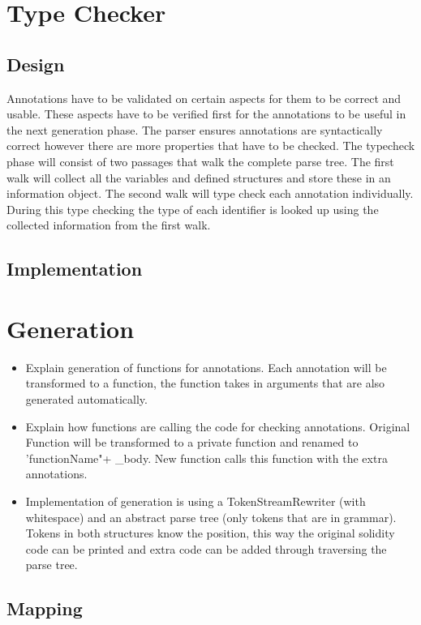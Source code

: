 \documentclass[a4paper]{article}
\begin{document}
\section{Type Checker}
\label{sec:typechecker}
\subsection{Design}
Annotations have to be validated on certain aspects for them to be correct and usable. These aspects have to be verified first for the annotations to be useful in the next generation phase. The parser ensures annotations are syntactically correct however there are more properties that have to be checked. The typecheck phase will consist of two passages that walk the complete parse tree. The first walk will collect all the variables and defined structures and store these in an information object. The second walk will type check each annotation individually. During this type checking the type of each identifier is looked up using the collected information from the first walk. 
\subsection{Implementation}


\section{Generation}
\label{sec:generation}
\begin{itemize}
    \item Explain generation of functions for annotations. Each annotation will be transformed to a function, the function takes in arguments that are also generated automatically.
    \item Explain how functions are calling the code for checking annotations. Original Function will be transformed to a private function and renamed to 'functionName"+ \_body. New function calls this function with the extra annotations.
    \item Implementation of generation is using a TokenStreamRewriter (with whitespace) and an abstract parse tree (only tokens that are in grammar). Tokens in both structures know the position, this way the original solidity code can be printed and extra code can be added through traversing the parse tree.
\end{itemize}
\subsection{Mapping}
\end{document}
